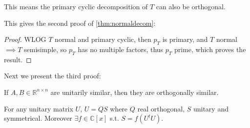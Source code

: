 \begin{remark}
    This means the primary cyclic decomposition of $T$ can also be orthogonal.
\end{remark}

This gives the second proof of \autoref{thm:normaldecom}:
\begin{proof}[Proof]
    WLOG $T$ normal and primary cyclic,
	then $p_T$ is primary, and $T$ normal $ \implies T$ semisimple,
	so $p_T$ has no multiple factors, thus $p_T$ prime, which proves the result.
\end{proof}

Next we present the third proof:
\begin{proposition}
	If $A, B\in \mathbb{R}^{n\times n}$ are unitarily similar,
	then they are orthogonally similar.
\end{proposition}

\begin{lemma}[QS decomposition]
	For any unitary matrix $U$, $U = QS$ where $Q$ real orthogonal, $S$ unitary
	and symmetrical. Moreover $\exists f\in \mathbb{C}[x]$ s.t. $S = f(U^tU)$.
\end{lemma}
